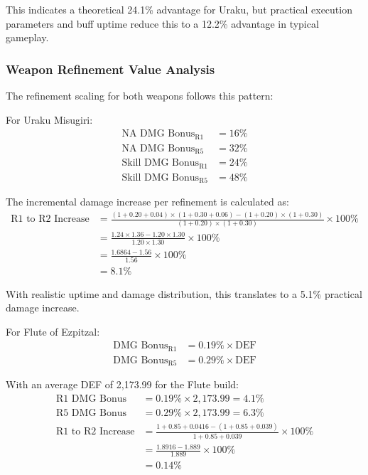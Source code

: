 \documentclass[12pt,a4paper]{article}
\begin{document}
This indicates a theoretical 24.1\% advantage for Uraku, but practical execution parameters and buff uptime reduce this to a 12.2\% advantage in typical gameplay.

\subsubsection{Weapon Refinement Value Analysis}

The refinement scaling for both weapons follows this pattern:

For Uraku Misugiri:
\begin{align}
\text{NA DMG Bonus}_{\text{R1}} &= 16\% \\
\text{NA DMG Bonus}_{\text{R5}} &= 32\% \\
\text{Skill DMG Bonus}_{\text{R1}} &= 24\% \\
\text{Skill DMG Bonus}_{\text{R5}} &= 48\%
\end{align}

The incremental damage increase per refinement is calculated as:
\begin{align}
\text{R1 to R2 Increase} &= \frac{(1 + 0.20 + 0.04) \times (1 + 0.30 + 0.06) - (1 + 0.20) \times (1 + 0.30)}{(1 + 0.20) \times (1 + 0.30)} \times 100\% \\
&= \frac{1.24 \times 1.36 - 1.20 \times 1.30}{1.20 \times 1.30} \times 100\% \\
&= \frac{1.6864 - 1.56}{1.56} \times 100\% \\
&= 8.1\%
\end{align}

With realistic uptime and damage distribution, this translates to a 5.1\% practical damage increase.

For Flute of Ezpitzal:
\begin{align}
\text{DMG Bonus}_{\text{R1}} &= 0.19\% \times \text{DEF} \\
\text{DMG Bonus}_{\text{R5}} &= 0.29\% \times \text{DEF}
\end{align}

With an average DEF of 2,173.99 for the Flute build:
\begin{align}
\text{R1 DMG Bonus} &= 0.19\% \times 2,173.99 = 4.1\% \\
\text{R5 DMG Bonus} &= 0.29\% \times 2,173.99 = 6.3\% \\
\text{R1 to R2 Increase} &= \frac{1 + 0.85 + 0.0416 - (1 + 0.85 + 0.039)}{1 + 0.85 + 0.039} \times 100\% \\
&= \frac{1.8916 - 1.889}{1.889} \times 100\% \\
&= 0.14\%
\end{align}
\end{document}
